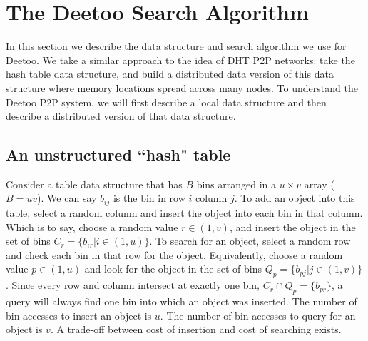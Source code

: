 \documentclass[conference]{IEEEtran}
\begin{document}
\section{The Deetoo Search Algorithm}\label{sec:model}
In this section we describe the data structure and search algorithm
we use for Deetoo.  We take a similar approach to the idea of DHT P2P networks: take the hash table
data structure, and build a distributed data version of this data structure
where memory locations spread across many nodes.  
To understand the Deetoo P2P system, we will first describe a local
data structure and then describe a distributed version of that data structure.

\subsection{An unstructured ``hash" table}
\label{sec:localtab}

Consider a table data structure that has $B$ bins arranged in a $u\times v$
array ($B=uv$).  We can say $b_{ij}$ is the bin in row $i$ column $j$.  To add an
object into this table, select a random column and insert the object into each
bin in that column.  Which is to say, choose a random value $r\in (1,v)$,
and insert the object in the set of bins $C_r = \{b_{ir} | i \in (1,u)\}$.
To search for an object, select a random row and check each bin in that
row for the
object.  Equivalently, choose a random value $p \in (1,u)$ and look
for the object in the set of bins $Q_p = \{b_{pj} | j \in (1,v)\}$.  Since
every row and column intersect at exactly one bin, $C_r \cap Q_p = \{b_{pr}\}$,
a query will always find
one bin into which an object was inserted.  The number of bin accesses to
insert an object is $u$.  The number of bin accesses to query for an object is
$v$.  A trade-off between cost of insertion and cost of searching exists.
\end{document}
